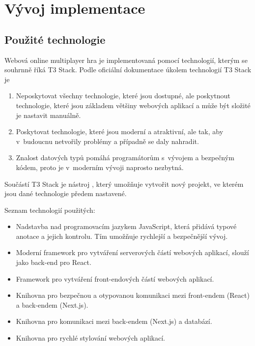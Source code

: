\chapter{Vývoj implementace}

\section{Použité technologie}

Webová online multiplayer hra je implementovaná pomocí technologií, kterým se
souhrnně říká T3 Stack. Podle oficiální dokumentace \cite{t3stack} úkolem
technologií T3 Stack je

\begin{enumerate}
    \item {} Neposkytovat všechny technologie, které jsou
        dostupné, ale poskytnout technologie, které jsou základem většiny
        webových aplikací a může být složité je nastavit manuálně.
    \item {} Poskytovat technologie, které jsou
        moderní a atraktivní, ale tak, aby v~budoucnu netvořily problémy a
        případně se daly nahradit.
    \item {} Znalost datových typů pomáhá
        programátorům s~vývojem a bezpečným kódem, proto je v~moderním vývoji
        naprosto nezbytná.
\end{enumerate}


Součástí T3 Stack je nástroj , který umožňuje vytvořit nový
projekt, ve kterém jsou dané technologie předem nastavené.

Seznam technologií použitých:
\begin{itemize}
    \item {} Nadstavba nad programovacím jazykem JavaScript, která
        přidává typové anotace a jejich kontrolu. Tím umožňuje rychlejší a
        bezpečnější vývoj.
    \item {} Moderní framework pro vytváření serverových částí
        webových  aplikací, slouží jako back-end pro React.
    \item {} Framework pro vytváření front-endových částí webových
        aplikací.
    \item {} Knihovna pro bezpečnou a otypovanou komunikaci mezi
        front-endem (React) a back-endem (Next.js).
    \item {} Knihovna pro komunikaci mezi back-endem (Next.js) a
        databází.
    \item {} Knihovna pro rychlé stylování webových aplikací.
\end{itemize}

